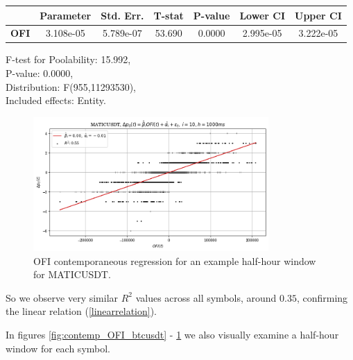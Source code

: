 \documentclass[a4paper, oneside, notitlepage]{book}
\begin{document}
\begin{table}
\begin{center}
\begin{tabular}{lclc}
\hline
\end{tabular}
\begin{tabular}{lcccccc}
             & \textbf{Parameter} & \textbf{Std. Err.} & \textbf{T-stat} & \textbf{P-value} & \textbf{Lower CI} & \textbf{Upper CI}  \\
\hline
\textbf{OFI} &     3.108e-05      &     5.789e-07      &      53.690     &      0.0000      &     2.995e-05     &     3.222e-05      \\
\hline
\end{tabular}
\end{center}
F-test for Poolability: 15.992, \\
P-value: 0.0000, \\
Distribution: F(955,11293530), \\
Included effects: Entity.
\end{table}

\begin{figure}[htpb]
    \centering
    \includegraphics[width=0.8\textwidth]{./images/maticusdt_h=1000ms_contemp_OFI.png}
    \caption{OFI contemporaneous regression for an example half-hour window for MATICUSDT.}
    \label{fig:contemp_OFI_maticusdt}
\end{figure}

\clearpage

So we observe very similar $R^2$ values across all symbols, around $0.35$, confirming the
linear relation (\ref{linearrelation}). %

In figures \ref{fig:contemp_OFI_btcusdt} - \ref{fig:contemp_OFI_maticusdt} 
we also visually examine a half-hour window for each symbol.
\end{document}
